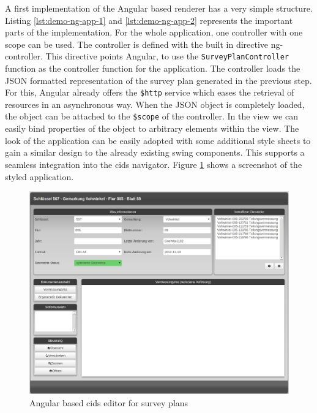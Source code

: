 A first implementation of the Angular based renderer has a very simple structure.
Listing \ref{lst:demo-ng-app-1} and \ref{lst:demo-ng-app-2} represents the important parts of the implementation.
For the whole application, one controller with one scope can be used.
The controller is defined with the built in directive ng-controller.
This directive points Angular, to use the \texttt{SurveyPlanController} function as the controller function for the application.
The controller loads the JSON formatted representation of the survey plan generated in the previous step.
For this, Angular already offers the \texttt{\$http} service which eases the retrieval of resources in an asynchronous way.
When the JSON object is completely loaded, the object can be attached to the \texttt{\$scope} of the controller.
In the view we can easily bind properties of the object to arbitrary elements within the view.
The look of the application can be easily adopted with some additional style sheets to gain a similar design to the already existing swing  components. This supports a seamless integration into the cids navigator.
Figure \ref{fig:survey_plan_angular_editor} shows a screenshot of the styled application.

\begin{figure}
	\centering	\includegraphics[width=1.0\textwidth]{./img/impl/survey_plan_editor_new_alpha.png}
	\caption{Angular based cids editor for survey plans}
	\label{fig:survey_plan_angular_editor}
\end{figure}
 
